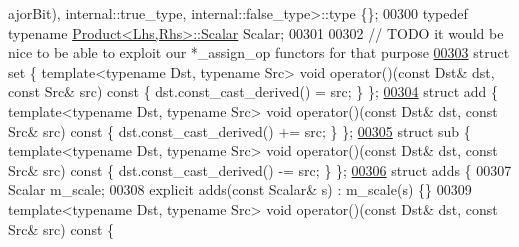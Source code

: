 \begin{DoxyCode}
      ajorBit), internal::true\_type, internal::false\_type>::type \{\};
00300   \textcolor{keyword}{typedef} \textcolor{keyword}{typename} \hyperlink{group___core___module_class_eigen_1_1_product}{Product<Lhs,Rhs>::Scalar} Scalar;
00301   
00302   \textcolor{comment}{// TODO it would be nice to be able to exploit our *\_assign\_op functors for that purpose}
\hyperlink{struct_eigen_1_1internal_1_1generic__product__impl_3_01_lhs_00_01_rhs_00_01_dense_shape_00_01_de53b08926de0225703046b27d8aadeb7a}{00303}   \textcolor{keyword}{struct }set  \{ \textcolor{keyword}{template}<\textcolor{keyword}{typename} Dst, \textcolor{keyword}{typename} Src> \textcolor{keywordtype}{void} operator()(\textcolor{keyword}{const} Dst& dst, \textcolor{keyword}{const} Src& src)\textcolor{keyword}{ const }
      \{ dst.const\_cast\_derived()  = src; \} \};
\hyperlink{struct_eigen_1_1internal_1_1generic__product__impl_3_01_lhs_00_01_rhs_00_01_dense_shape_00_01_de0df9d684cd6a4bf5cfd92fafd8f663ec}{00304}   \textcolor{keyword}{struct }add  \{ \textcolor{keyword}{template}<\textcolor{keyword}{typename} Dst, \textcolor{keyword}{typename} Src> \textcolor{keywordtype}{void} operator()(\textcolor{keyword}{const} Dst& dst, \textcolor{keyword}{const} Src& src)\textcolor{keyword}{ const }
      \{ dst.const\_cast\_derived() += src; \} \};
\hyperlink{struct_eigen_1_1internal_1_1generic__product__impl_3_01_lhs_00_01_rhs_00_01_dense_shape_00_01_de81a9bc57ab96e388cf835587b3174f05}{00305}   \textcolor{keyword}{struct }sub  \{ \textcolor{keyword}{template}<\textcolor{keyword}{typename} Dst, \textcolor{keyword}{typename} Src> \textcolor{keywordtype}{void} operator()(\textcolor{keyword}{const} Dst& dst, \textcolor{keyword}{const} Src& src)\textcolor{keyword}{ const }
      \{ dst.const\_cast\_derived() -= src; \} \};
\hyperlink{struct_eigen_1_1internal_1_1generic__product__impl_3_01_lhs_00_01_rhs_00_01_dense_shape_00_01_de79c82097ad07c840c671e4414c434d06}{00306}   \textcolor{keyword}{struct }adds \{
00307     Scalar m\_scale;
00308     \textcolor{keyword}{explicit} adds(\textcolor{keyword}{const} Scalar& s) : m\_scale(s) \{\}
00309     \textcolor{keyword}{template}<\textcolor{keyword}{typename} Dst, \textcolor{keyword}{typename} Src> \textcolor{keywordtype}{void} operator()(\textcolor{keyword}{const} Dst& dst, \textcolor{keyword}{const} Src& src)\textcolor{keyword}{ const }\{

\end{DoxyCode}
